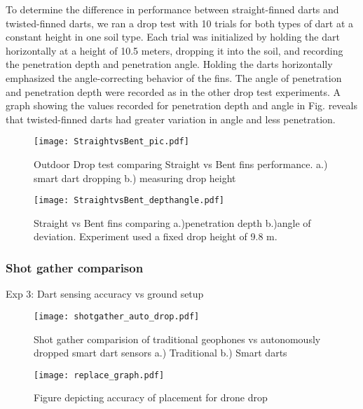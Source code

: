  To determine the difference in performance between straight-finned darts and twisted-finned darts, we ran a drop test with 10 trials for both types of dart at a constant height in one soil type. Each trial was initialized by holding the dart horizontally at a height of 10.5 meters, dropping it into the soil, and recording the penetration depth and penetration angle. Holding the darts horizontally emphasized the angle-correcting behavior of the fins. The angle of penetration and penetration depth were recorded as in the other drop test experiments. A graph showing the values recorded for penetration depth and angle in Fig. reveals that twisted-finned darts had greater variation in angle and less penetration.
\begin{figure} \centering
  {\texttt{[image: StraightvsBent\_pic.pdf]}}
 \caption{Outdoor Drop test comparing Straight vs Bent fins performance.
 a.)  smart dart dropping 
 b.)  measuring drop height} 
 \label{fig:StraightBentPic}
 \vspace{-1em}
\end{figure}
\begin{figure} \centering
  {\texttt{[image: StraightvsBent\_depthangle.pdf]}}
 \caption{Straight vs Bent fins comparing a.)penetration depth b.)angle of deviation. Experiment used a fixed drop height of 9.8 m.} 
 \label{fig:StraightBentDepth}
\end{figure}
\subsubsection{Shot gather comparison}
Exp 3: Dart sensing accuracy vs ground setup

\begin{figure} \centering
  {\texttt{[image: shotgather\_auto\_drop.pdf]}}
 \caption{Shot gather comparision of traditional geophones vs autonomously dropped smart dart sensors a.) Traditional b.) Smart darts} 
 \label{fig:TradvsAutoDrop}
\end{figure}

\begin{figure} \centering
  {\texttt{[image: replace\_graph.pdf]}}
 \caption{Figure depicting accuracy of placement for drone drop} 
 \label{fig:TradvsAutoDrop}
\end{figure}
 